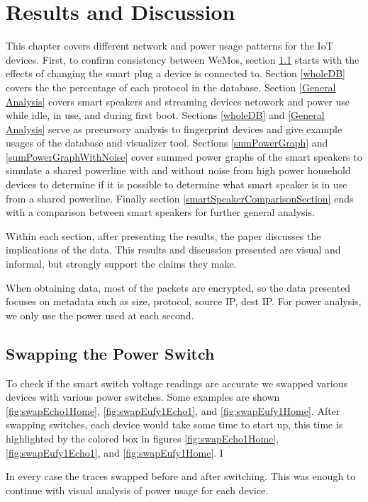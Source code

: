 \chapter{Results and Discussion}
\label{Results}
This chapter covers different network and power usage patterns for the IoT devices. First, to confirm consistency between WeMos, section \ref{swappingSwitch} starts with the effects of changing the smart plug a device is connected to. Section \ref{wholeDB} covers the the percentage of each protocol in the database. Section \ref{General Analysis} covers smart speakers and streaming devices netowork and power use while idle, in use, and during first boot. Sections \ref{wholeDB} and \ref{General Analysis} serve as precursory analysis to fingerprint devices and give example usages of the database and visualizer tool. Sections \ref{sumPowerGraph} and \ref{sumPowerGraphWithNoise} cover summed power graphs of the smart speakers to simulate a shared powerline with and without noise from high power household devices to determine if it is possible to determine what smart speaker is in use from a shared powerline. Finally section \ref{smartSpeakerComparisonSection} ends with a comparison between smart speakers for further general analysis.

Within each section, after presenting the results, the paper discusses the implications of the data. This results and discussion presented are visual and informal, but strongly support the claims they make.

When obtaining data, most of the packets are encrypted, so the data presented focuses on metadata such as size, protocol, source IP, dest IP. For power analysis, we only use the power used at each second.

\section{Swapping the Power Switch}
\label{swappingSwitch}
To check if the smart switch voltage readings are accurate we swapped various devices with various power switches. Some examples are shown \ref{fig:swapEcho1Home}, \ref{fig:swapEufy1Echo1}, and \ref{fig:swapEufy1Home}. After swapping switches, each device would take some time to start up, this time is highlighted by the colored box in figures \ref{fig:swapEcho1Home}, \ref{fig:swapEufy1Echo1}, and \ref{fig:swapEufy1Home}. I

In every case the traces swapped before and after switching. This was enough to continue with visual analysis of power usage for each device.

